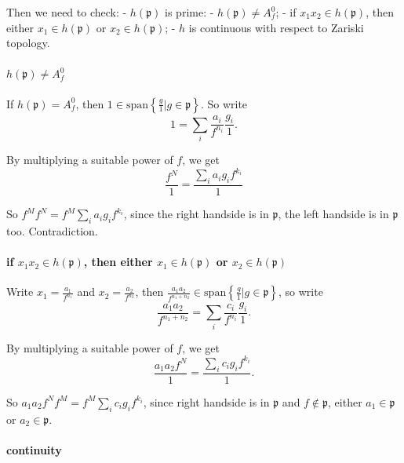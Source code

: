 \documentclass[11pt]{article}
\begin{document}
Then we need to check: - \(h(\mathfrak p)\) is prime: -
\(h(\mathfrak p)\ne A^0_f\); - if \(x_1 x_2\in h(\mathfrak p)\), then
either \(x_1\in h(\mathfrak p)\) or \(x_2 \in h(\mathfrak p)\); - \(h\)
is continuous with respect to Zariski topology.

    \hypertarget{hmathfrak-pne-a0_f}{%
\paragraph{\texorpdfstring{\(h(\mathfrak p)\ne A^0_f\)}{h(\textbackslash mathfrak p)\textbackslash ne A\^{}0\_f}}\label{hmathfrak-pne-a0_f}}

    If \(h(\mathfrak p)= A^0_f\), then
\(1\in\mathrm{span}\left\{\frac g1|g \in \mathfrak p\right\}\). So write
\[
1 = \sum_i\frac{a_i}{f^{n_i}}\frac {g_i}1.
\]

    By multiplying a suitable power of \(f\), we get \[
\frac{f^N} 1 = \frac{\sum_i a_i g_i f^{k_i}}1
\]

    So \(f^M f^N=f^M \sum_i a_i g_i f^{k_i}\), since the right handside is
in \(\mathfrak p\), the left handside is in \(\mathfrak p\) too.
Contradiction.

    \hypertarget{if-x_1-x_2in-hmathfrak-p-then-either-x_1in-hmathfrak-p-or-x_2-in-hmathfrak-p}{%
\paragraph{\texorpdfstring{if \(x_1 x_2\in h(\mathfrak p)\), then either
\(x_1\in h(\mathfrak p)\) or
\(x_2 \in h(\mathfrak p)\)}{if x\_1 x\_2\textbackslash in h(\textbackslash mathfrak p), then either x\_1\textbackslash in h(\textbackslash mathfrak p) or x\_2 \textbackslash in h(\textbackslash mathfrak p)}}\label{if-x_1-x_2in-hmathfrak-p-then-either-x_1in-hmathfrak-p-or-x_2-in-hmathfrak-p}}

    Write \(x_1=\frac{a_1}{f^{n_1}}\) and \(x_2=\frac{a_2}{f^{n_2}}\), then
\(\frac{a_1a_2}{f^{n_1+n_2}}\in\mathrm{span}\left\{\frac g1|g \in \mathfrak p\right\}\),
so write \[
\frac{a_1a_2}{f^{n_1+n_2}}=\sum_i \frac{c_i}{f^{n_i}}\frac{g_i}1.
\]

    By multiplying a suitable power of \(f\), we get \[
\frac{a_1a_2f^N}1=\frac{\sum_i c_ig_if^{k_i}}1.
\]

    So \(a_1a_2f^N f^M=f^M\sum_i c_ig_if^{k_i}\), since right handside is in
\(\mathfrak p\) and \(f\not\in\mathfrak p\), either
\(a_1\in\mathfrak p\) or \(a_2\in\mathfrak p\).

    \hypertarget{continuity}{%
\paragraph{continuity}\label{continuity}}
\end{document}
